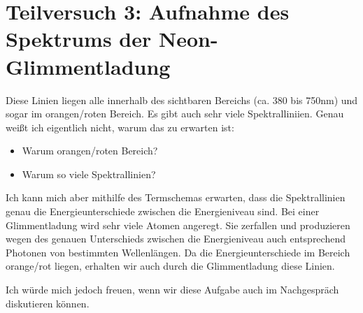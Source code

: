 \section{Teilversuch 3: Aufnahme des Spektrums der Neon-Glimm\-ent\-la\-dung}
	Diese Linien liegen alle innerhalb des sichtbaren Bereichs (ca. \num{380} bis \num{750}\si{\nano\meter}) \citep{starr_biology_2006} und sogar im orangen/roten Bereich. Es gibt auch sehr viele Spektralliniien. Genau weißt ich eigentlich nicht, warum das zu erwarten ist:
	\begin{itemize}
		\item Warum orangen/roten Bereich?
		\item Warum so viele Spektrallinien?
	\end{itemize}
	Ich kann mich aber mithilfe des Termschemas erwarten, dass die Spektrallinien genau die Energieunterschiede zwischen die Energieniveau sind. Bei einer Glimmentladung wird sehr viele Atomen angeregt. Sie zerfallen und produzieren wegen des genauen Unterschieds zwischen die Energieniveau auch entsprechend Photonen von bestimmten Wellenlängen. Da die Energieunterschiede im Bereich orange/rot liegen, erhalten wir auch durch die Glimmentladung diese Linien. 

	Ich würde mich jedoch freuen, wenn wir diese Aufgabe auch im Nachgespräch diskutieren können.



